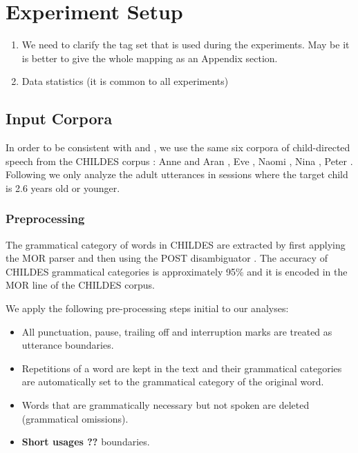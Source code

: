 \setcounter{ExperimentCounter}{1}
\section{Experiment Setup}
\begin{enumerate}
\item We need to clarify the tag set that is used during the
  experiments. May be it is better to give the whole mapping as an
  Appendix section.
\item Data statistics (it is common to all experiments)
\end{enumerate}
\subsection{Input Corpora}

In order to be consistent with \cite{clair2010} and \cite{Mintz200391},
we use the same six corpora of child-directed speech from the CHILDES
corpus \citep*{macwhinney2000childes}: Anne and Aran
\citep*{theakston2001role}, Eve \citep*{JCL:1765112}, Naomi
\citep*{sachs1983talking}, Nina \citep*{suppes1974semantics}, Peter
\citep*{Bloom1974380, bloom1975structure}.  Following
\cite{Mintz200391} we only analyze the adult utterances in sessions
where the target child is 2.6 years old or younger.

\subsubsection{Preprocessing}

The grammatical category of words in CHILDES are extracted by first
applying the MOR parser \citep*{macwhinney2000childes} and then using
the POST disambiguator \citep*{sagae2004automatic}.  The accuracy of
CHILDES grammatical categories is approximately 95\%
\citep*{parisse2000automatic} and it is encoded in the MOR line of the
CHILDES corpus.

We apply the following pre-processing steps \citep*{clair2010} initial
to our analyses:
\begin{itemize}
\item All punctuation, pause, trailing off and interruption marks are
  treated as utterance boundaries.
\item Repetitions of a word are kept in the text and their grammatical
  categories are automatically set to the grammatical category of the
  original word.
\item Words that are grammatically necessary but not spoken are
  deleted (grammatical omissions).
\item {\bf Short usages ??}
    boundaries. 
\end{itemize}

